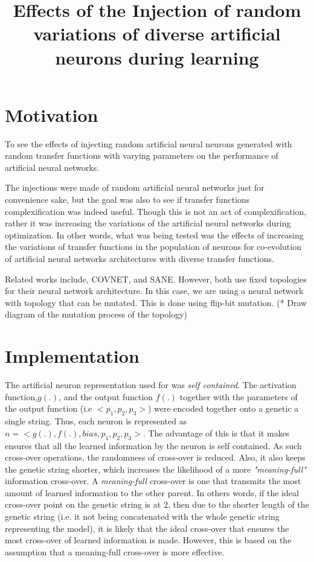 \documentclass[12pt]{article} %
\title{Effects of the Injection of random variations of diverse artificial neurons during learning}
\begin{document}
\maketitle

\section{Motivation}
To see the effects of injecting random artificial neural neurons generated with random transfer functions with varying parameters on the performance of artificial neural networks. 

The injections were made of random artificial neural networks just for convenience sake, but the goal was also to see if transfer functions complexification was indeed useful. Though this is not an act of complexification, rather it was increasing the variations of the artificial neural networks during optimization. In other words, what was being tested was the effects of increasing the variations of transfer functions in the population of neurons for co-evolution of artificial neural networks architectures with diverse transfer functions.

Related works include, COVNET, and SANE. However, both use fixed topologies for their neural network architecture. In this case, we are using a neural network with topology that can be mutated. This is done using flip-bit mutation. (* Draw diagram of the mutation process of the topology)
\section{Implementation}
The artificial neuron representation used for was \emph{self contained}. The activation function,$g(.)$, and the output function $f(.)$ together with the parameters of the output function (i.e $<p_1, p_2, p_3> $) were encoded together onto a genetic a single string. Thus, each neuron is  represented as  $n = <g(.),f(.), bias, p_1,p_2,p_3> $. The advantage of this is that it makes ensures that all the learned information by the neuron is self contained. As such cross-over operations, the randomness of cross-over is reduced. Also, it also keeps the genetic string shorter, which increases the likelihood of a more \emph{"meaning-full"} information cross-over. A \emph{meaning-full} cross-over is one that transmits the most amount of learned information to the other parent. In others words, if the ideal cross-over point on the genetic string is at $2$, then due to the shorter length of the genetic string (i.e. it not being concatenated with the whole genetic string representing the model), it is likely that the ideal cross-over that ensures the most cross-over of learned information is made. However, this is based on the assumption that a meaning-full cross-over is more effective.
\end{document}
